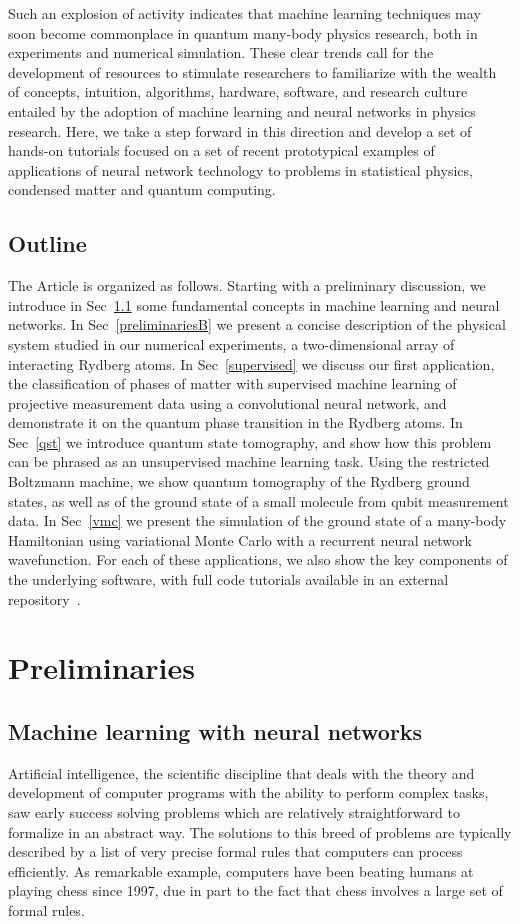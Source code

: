 \documentclass[twocolumn,english,reprint,superscriptaddress,longbibliography,pra]{revtex4-1}
\begin{document}
Such an explosion of activity indicates that machine learning techniques may soon become commonplace in quantum many-body physics research, both in experiments and numerical simulation. These clear trends call for the development of resources to stimulate researchers to familiarize with the wealth of concepts, intuition, algorithms, hardware, software, and research culture entailed by the adoption of machine learning and neural networks in physics research. Here, we take a step forward in this direction and develop a set of hands-on tutorials focused on a set of recent prototypical examples of applications of neural network technology to problems in statistical physics, condensed matter and quantum computing. 

\subsection*{Outline}
The Article is organized as follows. Starting with a preliminary discussion, we introduce in Sec~\ref{preliminariesA} some fundamental concepts in machine learning and neural networks. In Sec~\ref{preliminariesB} we present a concise description of the physical system studied in our numerical experiments, a two-dimensional array of interacting Rydberg atoms. In Sec~\ref{supervised} we discuss our first application, the classification of phases of matter with supervised machine learning of projective measurement data using a convolutional neural network, and demonstrate it on the quantum phase transition in the Rydberg atoms. In Sec~\ref{qst} we introduce quantum state tomography, and show how this problem can be phrased as an unsupervised machine learning task. Using the restricted Boltzmann machine, we show quantum tomography of the Rydberg ground states, as well as of the ground state of a small molecule from qubit measurement data. In Sec~\ref{vmc} we present the simulation of the ground state of a many-body Hamiltonian using variational Monte Carlo with a recurrent neural network wavefunction. For each of these applications, we also show the key components of the underlying software, with full code tutorials available in an external repository~\cite{coderepo}.


\section{Preliminaries}
\subsection{Machine learning with neural networks}
\label{preliminariesA}
Artificial intelligence, the scientific discipline that deals with the theory and development of computer programs with the ability to perform complex tasks, saw early success solving problems which are relatively straightforward to formalize in an abstract way. The solutions to this breed of problems are typically described by a list of very precise formal rules that computers can process efficiently. As remarkable example, computers have been beating humans at playing chess since 1997, due in part to the fact that chess involves a large set of formal rules.
\end{document}
